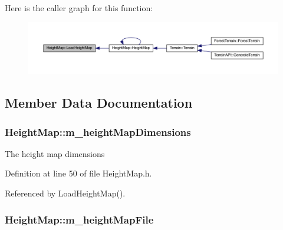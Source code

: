 Here is the caller graph for this function\+:
\nopagebreak
\begin{figure}[H]
\begin{center}
\leavevmode
\includegraphics[width=350pt]{class_height_map_af4faa63fa0dfe8386342e45127d708d4_icgraph}
\end{center}
\end{figure}




\subsection{Member Data Documentation}
\subsubsection[{\texorpdfstring{m\+\_\+height\+Map\+Dimensions}{m_heightMapDimensions}}]{ Height\+Map\+::m\+\_\+height\+Map\+Dimensions\hspace{0.3cm}{\ttfamily [private]}}\hypertarget{class_height_map_abf8f6fd763c9f44a6b7602a35e96cf58}{}\label{class_height_map_abf8f6fd763c9f44a6b7602a35e96cf58}


The height map dimensions 



Definition at line 50 of file Height\+Map.\+h.



Referenced by Load\+Height\+Map().

\subsubsection[{\texorpdfstring{m\+\_\+height\+Map\+File}{m_heightMapFile}}]{ Height\+Map\+::m\+\_\+height\+Map\+File\hspace{0.3cm}{\ttfamily [private]}}\hypertarget{class_height_map_ae9b9a9f4af0846321a8b03ff46dee730}{}\label{class_height_map_ae9b9a9f4af0846321a8b03ff46dee730}


